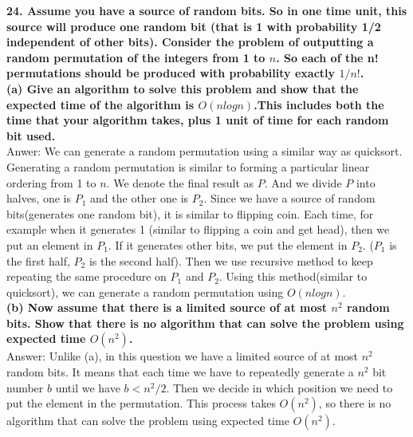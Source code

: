 \documentclass{article}
\begin{document}
\textbf{24. Assume you have a source of random bits. So in one time unit, this source will produce one random bit (that is 1 with probability 1/2 independent of other bits). Consider the problem of outputting a random permutation of the integers from 1 to $n$. So each of the n! permutations should be produced with probability exactly $1/n!$.} \\ \newline
\textbf{(a) Give an algorithm to solve this problem and show that the expected time of the algorithm is $O(nlogn)$.This includes both the time that your algorithm takes, plus 1 unit of time for each random bit used.} \\ \newline
Anwer: We can generate a random permutation using a similar way as quicksort. Generating a random permutation is similar to forming a particular linear ordering from 1 to $n$. We denote the final result as $P$. And we divide $P$ into halves, one is $P_1$ and the other one is $P_2$. Since we have a source of random bits(generates one random bit), it is similar to flipping coin. Each time, for example when it generates 1 (similar to flipping a coin and get head), then we put an element in $P_1$. If it generates other bits, we put the element in $P_2$. ($P_1$ is the first half, $P_2$ is the second half). Then we use recursive method to keep repeating the same procedure on $P_1$ and $P_2$. Using this method(similar to quicksort), we can generate a random permutation using $O(nlogn)$.\\ \newline
\textbf{(b) Now assume that there is a limited source of at most $n^2$ random bits. Show that there is no algorithm that can solve the problem using expected time $O(n^2)$.}\\ \newline
Answer: Unlike (a), in this question we have a limited source of at most $n^2$ random bits. It means that each time we have to repeatedly generate a $n^2$ bit number $b$ until we have $b < n^2/2$. Then we decide in which position we need to put the element in the permutation. This process takes $O(n^2)$, so there is no algorithm that can solve the problem using expected time $O(n^2)$. 
\end{document}
